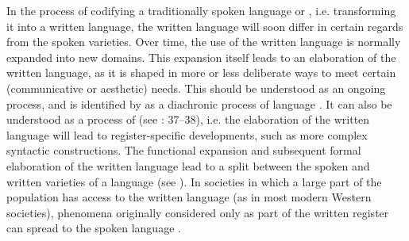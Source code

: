 \documentclass[output=paper]{langscibook}
\begin{document}
In the process of codifying a traditionally spoken language or , i.e. transforming it into a written language, the written language will soon differ in certain regards from the spoken varieties. Over time, the use of the written language is normally expanded into new domains. This expansion itself leads to an elaboration of the written language, as it is shaped in more or less deliberate ways to meet certain (communicative or aesthetic) needs. This should be understood as an ongoing process, and is identified by \citet{Kloss1967} as a diachronic process of language . It can also be understood as a process of  (see \citealt{Fischer2007}: 37–38), i.e. the elaboration of the written language will lead to register-specific developments, such as more complex syntactic constructions. The functional expansion and subsequent formal elaboration of the written language lead to a split between the spoken and written varieties of a language (see \citealt{Hoder2009}). In societies in which a large part of the population has access to the written language (as in most modern Western societies), phenomena originally considered only as part of the written register can spread to the spoken language \parencites[37]{Fischer2007}[]{Weis2004}. 
\end{document}
